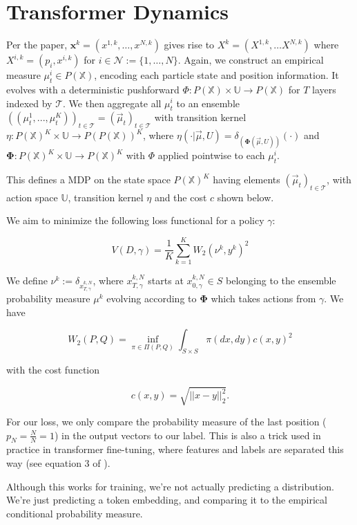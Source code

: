 \documentclass{article}
\begin{document}
\section{Transformer Dynamics}
Per the paper, $\bm{x}^k = (x^{1, k}, \dots, x^{N, k})$ gives rise to $X^k = (X^{1, k}, \dots X^{N, k})$ where $X^{i, k} = ( p_i, x^{i, k})$ for $i \in \mathcal{N} := \{1, \dots, N\}$. Again, we construct an empirical measure $\mu^i_t \in P(\mathbb{X})$, encoding each particle state and position information. It evolves with a deterministic pushforward $\Phi: P(\mathbb{X})\times \mathbb U \to P(\mathbb{X})$ for $T$ layers indexed by $\mathcal{T}$. We then aggregate all $\mu^i_t$ to an ensemble $((\mu^1_t, ... , \mu^K_t))_{t \in \mathcal{T}}=(\vec \mu_t)_{t \in \mathcal{T}}$ with transition kernel $\eta : P(\mathbb{X})^K \times \mathbb U\to P(P(\mathbb{X}))^K$, where $\eta (\cdot|\vec\mu, U) = \delta _{(\bm{\Phi} (\vec \mu, U))}(\cdot)$ and $\bm{\Phi} : P(\mathbb{X})^K\times \mathbb U \to P(\mathbb{X})^K$ with $\Phi$ applied pointwise to each $\mu^i_t$. 

This defines a MDP on the state space $P(\mathbb{X})^K$ having elements $(\vec \mu_t)_{t \in \mathcal{T}}$, with action space $\mathbb U$, transition kernel $\eta$ and the cost $c$ shown below.

We aim to minimize the following loss functional for a policy $\gamma$:

$$
V(D, \gamma) =  \frac{1}{K}\sum _{k = 1}^K W_{2}(\nu^k ,y^k)^2 
$$

We define $\nu^k := \delta_{x^{k, N}_{T, \gamma}}$, where $x^{k, N}_{T, \gamma}$ starts at $x^{k, N}_{0, \gamma} \in S$ belonging to the ensemble probability measure $\mu^k$ evolving according to $\bm{\Phi}$ which takes actions from $\gamma$. We have

$$W_2(P, Q) = \inf _{\pi \in \Pi (P, Q)} \int _{S \times S} \pi(dx, dy) c(x, y)^2$$

with the cost function 

$$ c(x, y) =  \sqrt{||x-y||_2^2}.$$

For our loss, we only compare the probability measure of the last position ($p_N = \frac{N}{N} = 1$) in the output vectors to our label. This is also a trick used in practice in transformer fine-tuning, where features and labels are separated this way (see equation 3 of \cite{radford2018improving}). 

Although this works for training, we're not actually predicting a distribution. We're just predicting a token embedding, and comparing it to the empirical conditional probability measure. 
\end{document}
